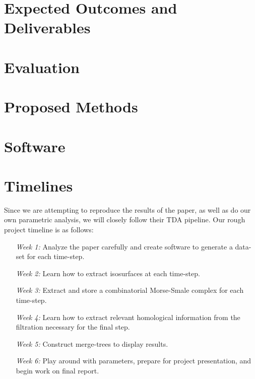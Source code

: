 \documentclass[12pt, fullpage,letterpaper]{article}
\begin{document}
	\section*{\normalfont Expected Outcomes and Deliverables}  
	
	\section*{\normalfont Evaluation}  
	
	\section*{\normalfont Proposed Methods}  

	\section*{\normalfont Software}  
	
	\section*{\normalfont Timelines}  

	Since we are attempting to reproduce the results of the paper, as well as do our own parametric analysis, we will closely follow their TDA pipeline. Our rough project timeline is as follows:
	\begin{enumerate}
		\item[{\textit{Week 1:}}] 
		Analyze the paper carefully and create software to generate a data-set for each time-step.
		\item[{\textit{Week 2:}}] 
		Learn how to extract isosurfaces at each time-step.
		\item[{\textit{Week 3:}}] 
		Extract and store a combinatorial Morse-Smale complex for each time-step.
		\item[{\textit{Week 4:}}] 
		Learn how to extract relevant homological information from the filtration necessary for the final step.
		\item[{\textit{Week 5:}}]  
		Construct merge-trees to display results.
		\item[{\textit{Week 6:}}] 
		Play around with parameters, prepare for project presentation, and begin work on final report. 
	\end{enumerate}  
\end{document}
